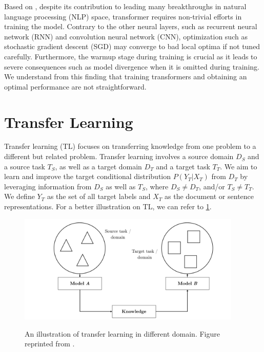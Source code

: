 Based on , despite its contribution to leading many breakthroughs in natural language processing (NLP) space, transformer requires non-trivial efforts in training the model. Contrary to the other neural layers, such as recurrent neural network (RNN) and convolution neural network (CNN), optimization such as stochastic gradient descent (SGD) may converge to bad local optima if not tuned carefully. Furthermore, the warmup stage during training is crucial as it leads to severe consequences such as model divergence when it is omitted during training. We understand from this finding that training transformers and obtaining an optimal performance are not straightforward.

\section{Transfer Learning}
\label{sec:bm_tl}
Transfer learning (TL) focuses on transferring knowledge from one problem to a different but related problem. Transfer learning involves a source domain $D_S$ and a source task $T_S$, as well as a target domain $D_T$ and a target task $T_T$. We aim to learn and improve the target conditional distribution $P(Y_T|X_T)$ from $D_T$ by leveraging information from $D_S$ as well as $T_S$, where $D_S \neq D_T$, and/or $T_S \neq T_T$. We define $Y_T$ as the set of all target labels and $X_T$ as the document or sentence representations. For a better illustration on TL, we can refer to \cref{img:transfer_learning}.

\begin{figure}[h]
    {\includegraphics[width=0.95\textwidth]{img/transfer_learning_scenario.png}}
    \centering
    \caption{An illustration of transfer learning in different domain. Figure reprinted from .}
    \label{img:transfer_learning}
\end{figure}

